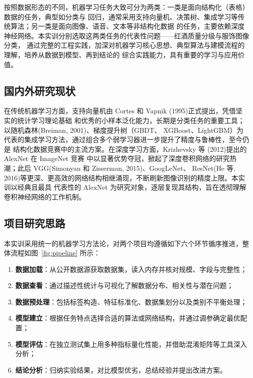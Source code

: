 \documentclass[12pt,a4paper,fontset=fandol]{ctexart}   %
\numberwithin{figure}{section}
\numberwithin{table}{section}
\numberwithin{equation}{section}
\begin{document}
按照数据形态的不同，机器学习任务大致可分为两类：一类是面向结构化（表格）数据的任务，典型如分类与
回归，通常采用支持向量机、决策树、集成学习等传统算法；另一类是面向图像、语音、文本等非结构化数据
的任务，主要依赖深度神经网络。本实训分别选取这两类任务的代表性问题——红酒质量分级与服饰图像分类，
通过完整的工程实践，加深对机器学习核心思想、典型算法与建模流程的理解，培养从数据到模型、再到结论的
综合实践能力，具有重要的学习与应用价值。

\subsection{国内外研究现状}
在传统机器学习方面，支持向量机由 Cortes 和 Vapnik (1995)正式提出，凭借坚实的统计学习理论基础
和优秀的小样本泛化能力，长期是分类任务的重要工具；以随机森林(Breiman, 2001)、梯度提升树（GBDT、
XGBoost、LightGBM）为代表的集成学习方法，通过组合多个弱学习器进一步提升了精度与鲁棒性，至今仍是
结构化数据竞赛中的主流方案。在深度学习方面，Krizhevsky 等 (2012)提出的 AlexNet 在 ImageNet 竞赛
中以显著优势夺冠，掀起了深度卷积网络的研究热潮；此后 VGG(Simonyan 和 Zisserman, 2015)、GoogLeNet、
ResNet(He 等, 2016)等更深、更高效的网络结构相继涌现，不断刷新图像识别的精度上限。本实训以经典且最具
代表性的 AlexNet 为研究对象，逐层复现其结构，旨在透彻理解卷积神经网络的工作机制。

\subsection{项目研究思路}
本实训采用统一的机器学习方法论，对两个项目均遵循如下六个环节循序推进，整体流程如图~\ref{fig:pipeline}
所示：

\begin{enumerate}[label=（\arabic*）,leftmargin=3em]
  \item \textbf{数据加载}：从公开数据源获取数据集，读入内存并核对规模、字段与完整性；
  \item \textbf{数据查看}：通过描述性统计与可视化了解数据分布、相关性与潜在问题；
  \item \textbf{数据预处理}：包括标签构造、特征标准化、数据集划分以及类别不平衡处理；
  \item \textbf{模型建立}：根据任务特点选择合适的算法或网络结构，并通过调参确定最优配置；
  \item \textbf{模型评估}：在独立测试集上用多种指标量化性能，并借助混淆矩阵等工具深入分析；
  \item \textbf{结论分析}：归纳实验结果，对比模型优劣，总结经验并提出改进方案。
\end{enumerate}
\end{document}
